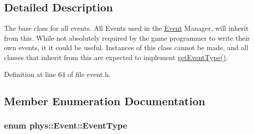 \subsection{Detailed Description}
The base class for all events. All Events used in the \hyperlink{classphys_1_1Event}{Event} Manager, will inherit from this. While not absolutely required by the game programmer to write their own events, it it could be useful. Instances of this class cannot be made, and all classes that inherit from this are expected to implement \hyperlink{classphys_1_1Event_ac2c0623a6bc399e62f4b9fb2c022ea73}{getEventType()}. 

Definition at line 64 of file event.h.



\subsection{Member Enumeration Documentation}
\hypertarget{classphys_1_1Event_af5fdbb3e08d8e578d58770fbc606fda7}{
\subsubsection[{EventType}]{\setlength{\rightskip}{0pt plus 5cm}enum {\bf phys::Event::EventType}}}
\label{d5/dcb/classphys_1_1Event_af5fdbb3e08d8e578d58770fbc606fda7}
